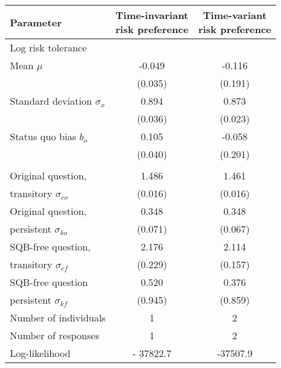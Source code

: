 {
\begin{tabular}{l *{2}{c}}
	\toprule
	\textbf{Parameter} & \thead{Time-invariant\\ risk preference} & \thead{Time-variant\\ risk preference} \\
	\midrule
	\multicolumn{3}{l}{Log risk tolerance}\\
	\hspace{2em} Mean $\mu$ & -0.049 & -0.116 \\
	 & (0.035) & (0.191) \\
	\hspace{2em} Standard deviation $\sigma_x$ & 0.894 & 0.873 \\
	 & (0.036) & (0.023) \\
	Status quo bias $b_o$ & 0.105 & -0.058 \\
	& (0.040) & (0.201) \\
	
	\addlinespace 
	\multicolumn{3}{l}{Response error standard deviation}\\
	\hspace{2em} Original question, & 1.486 & 1.461 \\
	\hspace{3em} transitory $\sigma_{eo}$ & (0.016) & (0.016) \\
	\hspace{2em} Original question, & 0.348 & 0.348 \\
	\hspace{3em} persistent $\sigma_{ko}$ & (0.071) & (0.067) \\
	\hspace{2em} SQB-free question,  & 2.176 & 2.114 \\
	\hspace{3em} transitory $\sigma_{ef}$ & (0.229) & (0.157) \\
	\hspace{2em} SQB-free question & 0.520 & 0.376 \\
	\hspace{3em} persistent $\sigma_{kf}$ & (0.945) & (0.859) \\
	\midrule
	Number of individuals & 1 & 2 \\
	Number of responses & 1 & 2 \\
	Log-likelihood & - 37822.7 & -37507.9 \\
	\bottomrule
\end{tabular}
}